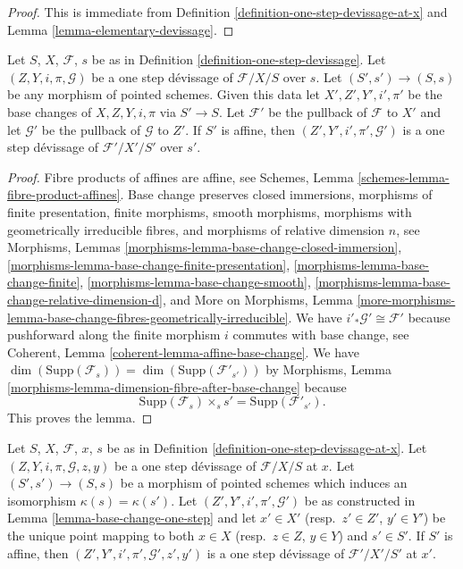 \begin{proof}
This is immediate from
Definition \ref{definition-one-step-devissage-at-x}
and
Lemma \ref{lemma-elementary-devissage}.
\end{proof}

\begin{lemma}
\label{lemma-base-change-one-step}
Let $S$, $X$, $\mathcal{F}$, $s$ be as in
Definition \ref{definition-one-step-devissage}.
Let $(Z, Y, i, \pi, \mathcal{G})$ be a one step d\'evissage
of $\mathcal{F}/X/S$ over $s$.
Let $(S', s') \to (S, s)$ be any morphism of pointed schemes.
Given this data let $X', Z', Y', i', \pi'$ be the base
changes of $X, Z, Y, i, \pi$ via $S' \to S$.
Let $\mathcal{F}'$ be the pullback of $\mathcal{F}$ to $X'$
and let $\mathcal{G}'$ be the pullback of $\mathcal{G}$ to $Z'$.
If $S'$ is affine, then $(Z', Y', i', \pi', \mathcal{G}')$
is a one step d\'evissage of $\mathcal{F}'/X'/S'$ over $s'$.
\end{lemma}

\begin{proof}
Fibre products of affines are affine, see
Schemes, Lemma \ref{schemes-lemma-fibre-product-affines}.
Base change preserves
closed immersions,
morphisms of finite presentation,
finite morphisms,
smooth morphisms,
morphisms with geometrically irreducible fibres, and
morphisms of relative dimension $n$, see
Morphisms, Lemmas \ref{morphisms-lemma-base-change-closed-immersion},
\ref{morphisms-lemma-base-change-finite-presentation},
\ref{morphisms-lemma-base-change-finite},
\ref{morphisms-lemma-base-change-smooth}, 
\ref{morphisms-lemma-base-change-relative-dimension-d}, and
More on Morphisms, Lemma
\ref{more-morphisms-lemma-base-change-fibres-geometrically-irreducible}.
We have $i'_*\mathcal{G}' \cong \mathcal{F}'$ because pushforward
along the finite morphism $i$ commutes with base change, see
Coherent, Lemma \ref{coherent-lemma-affine-base-change}.
We have
$\dim(\text{Supp}(\mathcal{F}_s)) = \dim(\text{Supp}(\mathcal{F}'_{s'}))$
by
Morphisms, Lemma \ref{morphisms-lemma-dimension-fibre-after-base-change}
because
$$
\text{Supp}(\mathcal{F}_s) \times_s s' = \text{Supp}(\mathcal{F}'_{s'}).
$$
This proves the lemma.
\end{proof}

\begin{lemma}
\label{lemma-base-change-one-step-at-x}
Let $S$, $X$, $\mathcal{F}$, $x$, $s$ be as in
Definition \ref{definition-one-step-devissage-at-x}.
Let $(Z, Y, i, \pi, \mathcal{G}, z, y)$ be a one step d\'evissage
of $\mathcal{F}/X/S$ at $x$.
Let $(S', s') \to (S, s)$ be a morphism of pointed schemes
which induces an isomorphism $\kappa(s) = \kappa(s')$.
Let $(Z', Y', i', \pi', \mathcal{G}')$ be as constructed in
Lemma \ref{lemma-base-change-one-step}
and let $x' \in X'$ (resp.\ $z' \in Z'$, $y' \in Y'$) be the
unique point mapping to both $x \in X$ (resp.\ $z \in Z$, $y \in Y$)
and $s' \in S'$.
If $S'$ is affine, then $(Z', Y', i', \pi', \mathcal{G}', z', y')$
is a one step d\'evissage of $\mathcal{F}'/X'/S'$ at $x'$.
\end{lemma}

